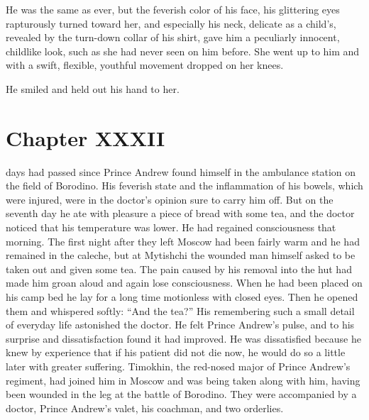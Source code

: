 He was the same as ever, but the feverish color of his face, his
glittering eyes rapturously turned toward her, and especially his
neck, delicate as a child's, revealed by the turn-down collar of
his shirt, gave him a peculiarly innocent, childlike look, such
as she had never seen on him before. She went up to him and with
a swift, flexible, youthful movement dropped on her knees.

He smiled and held out his hand to her.


\chapter*{Chapter XXXII} \ifaudio {}
\fi

 days had passed since Prince Andrew found himself in the
ambulance station on the field of Borodino. His feverish state
and the inflammation of his bowels, which were injured, were in
the doctor's opinion sure to carry him off. But on the seventh
day he ate with pleasure a piece of bread with some tea, and the
doctor noticed that his temperature was lower. He had regained
consciousness that morning. The first night after they left
Moscow had been fairly warm and he had remained in the caleche,
but at Mytishchi the wounded man himself asked to be taken out
and given some tea. The pain caused by his removal into the hut
had made him groan aloud and again lose consciousness. When he
had been placed on his camp bed he lay for a long time motionless
with closed eyes. Then he opened them and whispered softly: ``And
the tea?''  His remembering such a small detail of everyday life
astonished the doctor. He felt Prince Andrew's pulse, and to his
surprise and dissatisfaction found it had improved. He was
dissatisfied because he knew by experience that if his patient
did not die now, he would do so a little later with greater
suffering. Timokhin, the red-nosed major of Prince Andrew's
regiment, had joined him in Moscow and was being taken along with
him, having been wounded in the leg at the battle of
Borodino. They were accompanied by a doctor, Prince Andrew's
valet, his coachman, and two orderlies.

